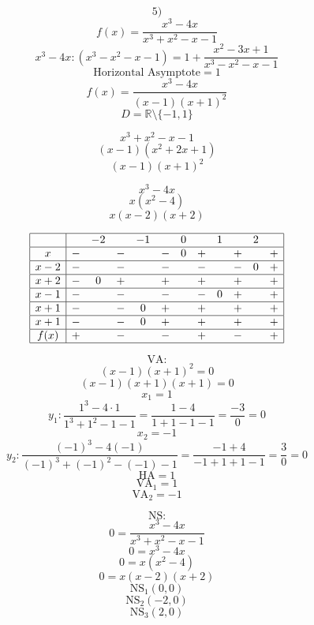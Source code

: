 \documentclass{article}
\begin{document}
\[ \text{5)} \]
\[ f(x) = \frac{x^3-4x}{x^3+x^2-x-1} \]
\[ x^3-4x : (x^3-x^2-x-1) = 1 + \frac{x^2-3x+1}{x^3-x^2-x-1} \]
\[ \text{Horizontal Asymptote} = 1 \]
\[ f(x) = \frac{x^3-4x}{(x-1)(x+1)^2} \]
\[ D = \mathbb{R} \setminus \{-1,1\} \]

\[ x^3+x^2-x-1 \]
\[ (x-1)(x^2+2x+1) \]
\[ (x-1)(x+1)^2 \]

\[ x^3-4x \]
\[ x(x^2-4) \]
\[ x(x-2)(x+2) \]

\[ \begin{array}{|c|ccccccccccc|}
\hline
 & & -2 & & -1 & & 0 & & 1 & & 2 & \\
\hline
x & - & & - & & - & 0 & + & & + & & + \\
\hline
x-2 & - & & - & & - & & - & & - & 0 & + \\
\hline
x+2 & - & 0 & + & & + & & + & & + & & + \\
\hline
x-1 & - & & - & & - & & - & 0 & + & & + \\
\hline
x+1 & - & & - & 0 & + & & + & & + & & + \\
\hline
x+1 & - & & - & 0 & + & & + & & + & & + \\
\hline
f(x) & + & & - & & - & & + &  & - & & + \\
\hline
\end{array} \]

\[ \text{VA:} \]
\[ (x-1)(x+1)^2 = 0 \]
\[ (x-1)(x+1)(x+1) = 0 \]
\[ x_1 = 1 \]
\[ y_1: \frac{1^3-4 \cdot 1}{1^3+1^2-1-1} = \frac{1-4}{1+1-1-1} = \frac{-3}{0} = 0 \]
\[ x_2 = -1 \]
\[ y_2: \frac{(-1)^3-4(-1)}{(-1)^3+(-1)^2-(-1)-1} = \frac{-1+4}{-1+1+1-1} = \frac{3}{0} = 0 \]
\[ \text{HA} = 1 \]
\[ \text{VA}_1 = 1 \]
\[ \text{VA}_2 = -1 \]

\[ \text{NS:} \]
\[ 0 = \frac{x^3-4x}{x^3+x^2-x-1} \]
\[ 0 = x^3-4x \]
\[ 0 = x(x^2-4) \]
\[ 0 = x(x-2)(x+2) \]
\[ \text{NS}_1 (0,0) \]
\[ \text{NS}_2 (-2,0) \]
\[ \text{NS}_3 (2,0) \]
\end{document}
